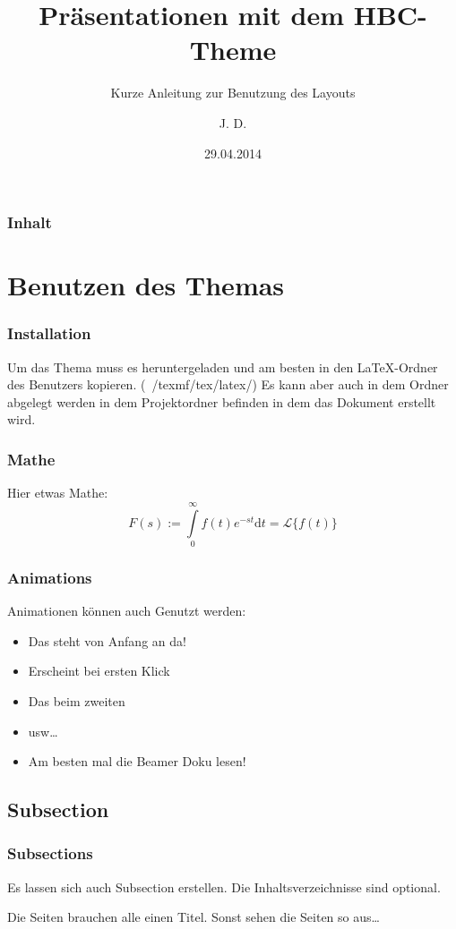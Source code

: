 \documentclass{beamer}
\title{\textbf{Präsentationen mit dem HBC-Theme}}
\subtitle{Kurze Anleitung zur Benutzung des Layouts}
\author{J. D.}
\date{29.04.2014}
\institute{Hochschule Biberach\\Studiengang Gebäudeklimatik}
\begin{document}
\titlepage

\begin{frame}
\frametitle{Inhalt}
\tableofcontents
\end{frame}


\section{Benutzen des Themas}
\sectionframe
\begin{frame}
\frametitle{Installation}
Um das Thema muss es heruntergeladen und am besten in den \LaTeX-Ordner des Benutzers kopieren. (~/texmf/tex/latex/)\linebreak
Es kann aber auch in dem Ordner abgelegt werden in dem Projektordner befinden in dem das Dokument erstellt wird.
\end{frame}

\begin{frame}
\frametitle{Mathe}
Hier etwas Mathe:
\begin{equation}
F(s):=\int\limits_{0}^{\infty}f(t)e^{-st}\mathrm{d}t=\mathscr{L}\{f(t)\}
\end{equation}
\end{frame}

\begin{frame}
\frametitle{Animations}
Animationen
\pause
können auch Genutzt werden:
\begin{itemize}[<+->]
  \item Das steht von Anfang an da!
  \item Erscheint bei ersten Klick
  \item Das beim zweiten
  \item usw…
  \item Am besten mal die Beamer Doku lesen!
\end{itemize}
\end{frame}

\subsection{Subsection}
\subsectionframe
\begin{frame}
\frametitle{Subsections}
Es lassen sich auch Subsection erstellen.\linebreak
Die Inhaltsverzeichnisse sind optional.
\end{frame}

\begin{frame}
Die  Seiten brauchen alle einen Titel.\linebreak
Sonst sehen die Seiten so aus…
\end{frame}
\end{document}
